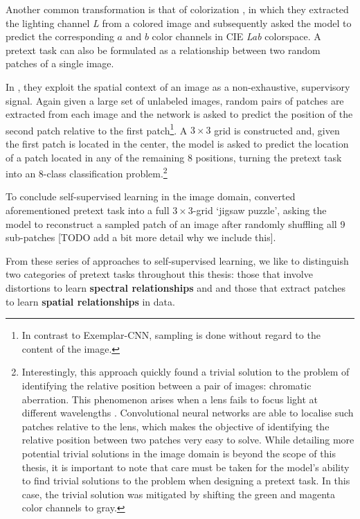 Another common transformation is that of colorization \cite{zhang_colorful_2016}, in which they extracted the lighting channel \textit{L} from a colored image and subsequently asked the model to predict the corresponding $a$ and $b$ color channels in CIE \textit{Lab} colorspace. A pretext task can also be formulated as a relationship between two random patches of a single image.

In \cite{doersch2015unsupervised}, they exploit the spatial context of an image as a non-exhaustive, supervisory signal. Again given a large set of unlabeled images, random pairs of patches are extracted from each image and the network is asked to predict the position of the second patch relative to the first patch\footnote{In contrast to Exemplar-CNN, sampling is done without regard to the content of the image.}. A $3\times 3$ grid is constructed and, given the first patch is located in the center, the model is asked to predict the location of a patch located in any of the remaining 8 positions, turning the pretext task into an 8-class classification problem.\footnote{
Interestingly, this approach quickly found a trivial solution to the problem of identifying the relative position between a pair of images: chromatic aberration. This phenomenon arises when a lens fails to focus light at different wavelengths \cite{brewster_treatise_1835}. Convolutional neural networks are able to localise such patches relative to the lens, which makes the objective of identifying the relative position between two patches very easy to solve. While detailing more potential trivial solutions in the image domain is beyond the scope of this thesis, it is important to note that care must be taken for the model's ability to find trivial solutions to the problem when designing a pretext task. In this case, the trivial solution was mitigated by shifting the green and magenta color channels to gray.
}

To conclude self-supervised learning in the image domain, \cite{noroozi_unsupervised_2016} converted aforementioned pretext task into a full $3\times 3$-grid `jigsaw puzzle', asking the model to reconstruct a sampled patch of an image after randomly shuffling all 9 sub-patches [TODO add a bit more detail why we include this].

From these series of approaches to self-supervised learning, we like to distinguish two categories of pretext tasks throughout this thesis: those that involve distortions to learn \textbf{spectral relationships} and and those that extract patches to learn \textbf{spatial relationships} in data. \\


